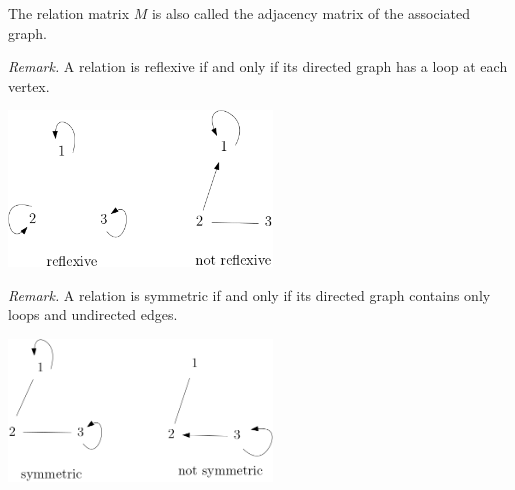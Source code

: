\documentclass[11pt]{article}
\begin{document}
    The relation matrix $M$ is also called the adjacency matrix of the associated graph.

    \pagebreak

    \emph{Remark.} A relation is reflexive if and only if its directed graph has a loop at each vertex.

    \begin{center}
        \includegraphics[width=7cm]{graph3.png}
    \end{center}

    \emph{Remark.} A relation is symmetric if and only if its directed graph contains only loops and undirected edges.

    \begin{center}
        \includegraphics[width=7cm]{graph4.png}
    \end{center}
\end{document}
